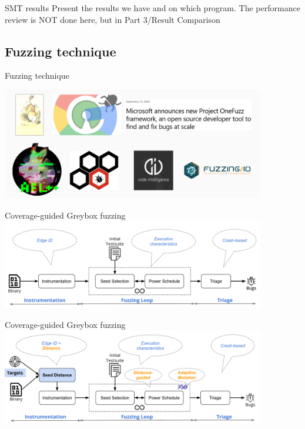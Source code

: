 \documentclass{beamer}
\begin{document}
\begin{frame}{SMT results}
Present the results we have and on which program. The performance review is NOT done here, but in Part 3/Result Comparison
\end{frame}

\subsection{Fuzzing technique}

\begin{frame}{Fuzzing technique}

\includegraphics[width=11.5cm]{Figures/Fuzzing/graph1.png}

\end{frame}

\begin{frame}{Coverage-guided Greybox fuzzing}
\includegraphics[width=11.5cm]{Figures/Fuzzing/graph2.png}
\end{frame}

\begin{frame}{Coverage-guided Greybox fuzzing}
\includegraphics[width=11.5cm]{Figures/Fuzzing/graph3.png}
\end{frame}
\end{document}
